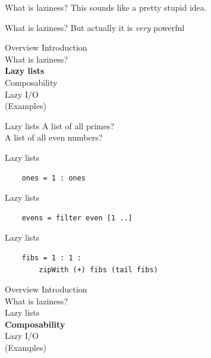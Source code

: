 \documentclass[20pt]{beamer}
\begin{document}
\begin{frame}{What is laziness?}
    This sounds like a pretty stupid idea.
\end{frame}

\begin{frame}{What is laziness?}
    But actually it is \textit{very} powerful
\end{frame}


\begin{frame}{Overview}
    Introduction \\
    What is laziness? \\
    \textbf{Lazy lists} \\
    Composability \\
    Lazy I/O \\
    (Examples)
\end{frame}

\begin{frame}{Lazy lists}
    A list of all primes? \\
    A list of all even numbers?
\end{frame}

\begin{frame}[fragile]{Lazy lists}
    \begin{lstlisting}
    ones = 1 : ones
    \end{lstlisting}
\end{frame}

\begin{frame}[fragile]{Lazy lists}
    \begin{lstlisting}
    evens = filter even [1 ..]
    \end{lstlisting}
\end{frame}

\begin{frame}[fragile]{Lazy lists}
    \begin{lstlisting}
    fibs = 1 : 1 :
        zipWith (+) fibs (tail fibs)
    \end{lstlisting}
\end{frame}


\begin{frame}{Overview}
    Introduction \\
    What is laziness? \\
    Lazy lists \\
    \textbf{Composability} \\
    Lazy I/O \\
    (Examples)
\end{frame}
\end{document}
